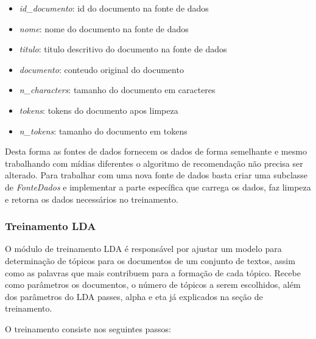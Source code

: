 \begin{itemize}
    \item \textit{id\_documento}: id do documento na fonte de dados
    \item \textit{nome}: nome do documento na fonte de dados
    \item \textit{titulo}: titulo descritivo do documento na fonte de dados
    \item \textit{documento}: conteudo original do documento
    \item \textit{n\_characters}: tamanho do documento em caracteres
    \item \textit{tokens}: tokens do documento apos limpeza
    \item \textit{n\_tokens}: tamanho do documento em tokens
\end{itemize}

Desta forma as fontes de dados fornecem os dados de forma semelhante e mesmo trabalhando com mídias diferentes o algoritmo de recomendação não 
precisa ser alterado. Para trabalhar com uma nova fonte de dados basta criar uma subclasse de \textit{FonteDados} e implementar a parte específica 
que carrega os dados, faz limpeza e retorna os dados necessários no treinamento.

\vspace{3mm} %


\subsubsection{Treinamento LDA}

O módulo de treinamento LDA é responsável por ajustar um modelo para determinação de tópicos para os documentos de um conjunto de textos, assim como as 
palavras que mais contribuem para a formação de cada tópico. Recebe como parâmetros os documentos, o número de tópicos a serem escolhidos, 
além dos parâmetros do LDA passes, alpha e eta já explicados na seção de treinamento.

O treinamento consiste nos seguintes passos:

